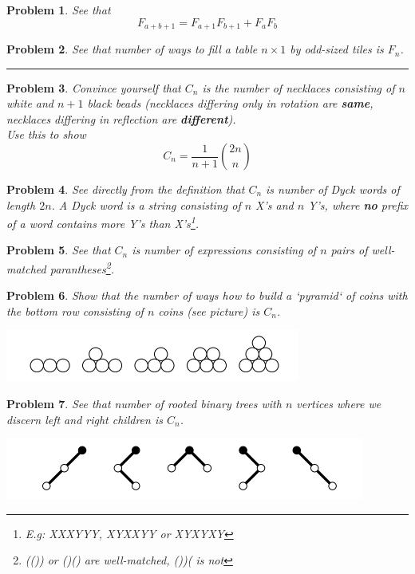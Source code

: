 \documentclass[11pt,a5paper]{article}
\newtheorem{problem}{Problem}
\begin{document}
\begin{problem}
See that \[F_{a+b+1} = F_{a+1}F_{b+1} + F_{a}F_{b}\]
\end{problem}

\begin{problem}
See that number of ways to fill a table $n \times 1$ by odd-sized tiles is $F_n$.
\end{problem}

\noindent\rule{\textwidth}{0.4pt}

\begin{problem}
Convince yourself that $C_n$ is the number of necklaces consisting of $n$ white and $n+1$ black beads (necklaces differing only in rotation are \textbf{same}, necklaces differing in reflection are \textbf{different}). \\
Use this to show \[C_n = {\frac{1}{n+1}} {{2n}\choose{n}}\]
\end{problem}

\begin{problem}
See directly from the definition that $C_n$ is number of \emph{Dyck words} of length $2n$. A Dyck word is a string consisting of $n$ X's and $n$ Y's, where \textbf{no} prefix of a word contains more Y's than X's\footnote{E.g: XXXYYY, XYXXYY or XYXYXY}.
\end{problem}

\begin{problem}
See that $C_n$ is number of expressions consisting of $n$ pairs of well-matched parantheses\footnote{(()) or ()() are well-matched, ())( is not}.
\end{problem}

\begin{problem}
Show that the number of ways how to build a `pyramid` of coins with the bottom row consisting of $n$ coins (see picture) is $C_n$.
\centerline{\includegraphics[scale=0.44]{pyramids}} 
\end{problem}

\begin{problem}
See that number of rooted binary trees with $n$ vertices where we discern left and right children is $C_n$. \\
\centerline{\includegraphics[scale=0.44]{trees}} 
\end{problem}
\end{document}
